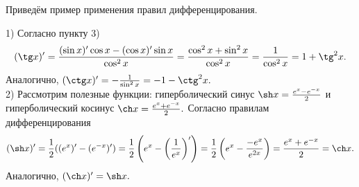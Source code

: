 Приведём пример применения правил дифференцирования.
\begin{example}
    1) Согласно пункту 3)
    $$
        (\tg x)'=\frac{(\sin x)'
            \cos x-(\cos x)'\sin x}{\cos^2x}=
        \frac{\cos^2x+\sin^2x}{\cos^2x}=\frac{1}{\cos^2x}
        =1+\tg^2x.
    $$
    Аналогично, $(\ctg x)'=
        -\frac{1}{\sin^2x}=-1-\ctg^2x.$\\
    2) Рассмотрим полезные функции: гиперболический
    синус $\sh x=\frac{e^x-e^{-x}}{2}$ и
    гиперболический косинус $\ch x=
        \frac{e^x+e^{-x}}{2}.$ Согласно правилам
    дифференцирования
    $$
        (\sh x)'=\frac{1}{2}((e^x)'-(e^{-x})')=
        \frac{1}{2}\left(e^x-\left(\frac{1}{e^x}
            \right)'\right)=\frac{1}{2}
        \left(e^x-\frac{-e^x}{e^{2x}}\right)=
        \frac{e^x+e^{-x}}{2}=\ch x.
    $$
    Аналогично, $(\ch x)'=\sh x.$
\end{example}

\newpage

